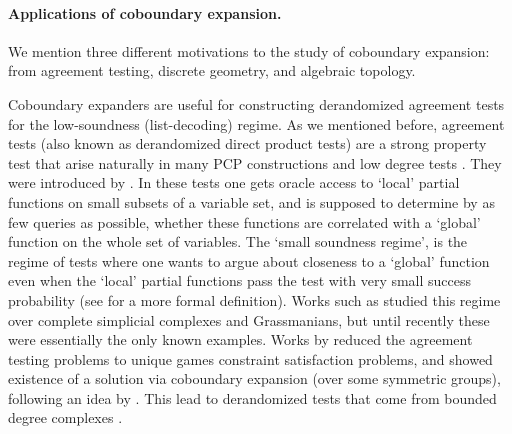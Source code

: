 \documentclass[10pt,a4paper]{article}
\theoremstyle{definition}
\theoremstyle{remark}
\newtheorem{remark}[theorem]{Remark}
\newcommand{\F}{\mathbb{F}}
\numberwithin{equation}{section}
\let\origparagraph\paragraph
\renewcommand{\paragraph}[1]{\origparagraph{#1.}}
\begin{document}


\paragraph{Applications of coboundary expansion}We mention three different motivations to the study of coboundary expansion: from agreement testing, discrete geometry, and algebraic topology.

Coboundary expanders are useful for constructing derandomized agreement tests for the low-soundness (list-decoding) regime. As we mentioned before, agreement tests (also known as derandomized direct product tests) are a strong property test that arise naturally in many PCP constructions \cite{dinur2007pcp, Raz-parrep,GolSaf97,ImpagliazzoKW2012} and low degree tests \cite{RuSu96,ArSu,RazS1997}. They were introduced by \cite{GolSaf97}. In these tests one gets oracle access to `local' partial functions on small subsets of a variable set, and is supposed to determine by as few queries as possible, whether these functions are correlated with a `global' function on the whole set of variables. The `small soundness regime', is the regime of tests where one wants to argue about closeness to a `global' function even when the `local' partial functions pass the test with very small success probability (see \cite{DG08} for a more formal definition). Works such as \cite{DG08,ImpagliazzoKW2012,DL17} studied this regime over complete simplicial complexes and Grassmanians, but until recently these were essentially the only known examples. Works by \cite{GotlibK2022,BafnaM2023,DiksteinD2023agr} reduced the agreement testing problems to unique games constraint satisfaction problems, and showed existence of a solution via coboundary expansion (over some symmetric groups), following an idea by \cite{DinurM2019}. This lead to derandomized tests that come from bounded degree complexes \cite{DiksteinDL2024,BafnaM2024}.
\end{document}
